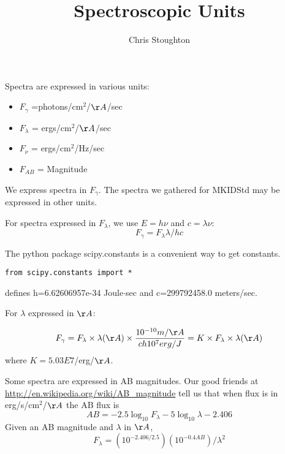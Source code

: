 \documentclass[11pt]{amsart}
\title{Spectroscopic Units}
\author{Chris Stoughton}
\date{}                                           %
\begin{document}
\maketitle

Spectra are expressed in various units:
\begin{itemize}
\item $F_\gamma$ =photons/cm$^2$/$\AA$/sec
\item $F_\lambda$ = ergs/cm$^2$/$\AA$/sec
\item $F_\nu$ = ergs/cm$^2$/Hz/sec
\item $F_{AB}$ =  Magnitude
\end{itemize}

We express spectra in $F_\gamma$.  The spectra we gathered for MKIDStd
may be expressed in other units.

For spectra expressed in $F_\lambda$, we use $E=h\nu$ and $c = \lambda\nu$:
\begin{equation}
F_\gamma = F_\lambda \lambda / hc
\end{equation}

The python package scipy.constants is a convenient way to get constants.
\begin{verbatim}
from scipy.constants import *
\end{verbatim}
defines h=6.62606957e-34 Joule$\cdot$sec and c=299792458.0
meters/sec.

For $\lambda$ expressed in $\AA$:

\begin{equation}
F_\gamma = F_\lambda \times \lambda(\AA) \times \frac{10^{-10} m/\AA}{ch10^7 erg/J} =  K \times F_\lambda \times \lambda(\AA)
\end{equation}
where $K=5.03E7$/erg/$\AA$. 

Some spectra are expressed in AB magnitudes.  Our good friends at
\url{http://en.wikipedia.org/wiki/AB_magnitude} tell us that
when flux is in erg/s/cm$^2$/$\AA$ the AB flux is
\begin{equation}
AB = -2.5\log_{10}{F_\lambda} -  5\log_{10}\lambda - 2.406
\end{equation}
Given an AB magnitude and $\lambda$ in $\AA$,
\begin{equation}
F_\lambda = (10^{-2.406/2.5})(10^{-0.4AB})/\lambda^2
\end{equation}
\end{document}
